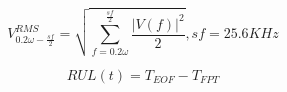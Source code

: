 \documentclass[xcolor=dvipsnames, professionalfonts, aspectratio=169, 11pt]{beamer}
\begin{document}
\begin{persian}
\begin{frame}
\begin{multicols}{2}
		$$ V_{0.2\omega-\frac{sf}{2	}}^{RMS}=\sqrt{\sum_{f=0.2\omega}^{\frac{sf}{2}}\frac{|V(f)|^2}{2}} , sf=25.6 KHz$$
		
		
		$$ RUL(t)=T_{EOF} - T_{FPT} $$
		
		\hfill
		
		
	\end{multicols}
	


%
%
%		
%	
	
	
	

\end{frame}
\end{persian}
\end{document}
